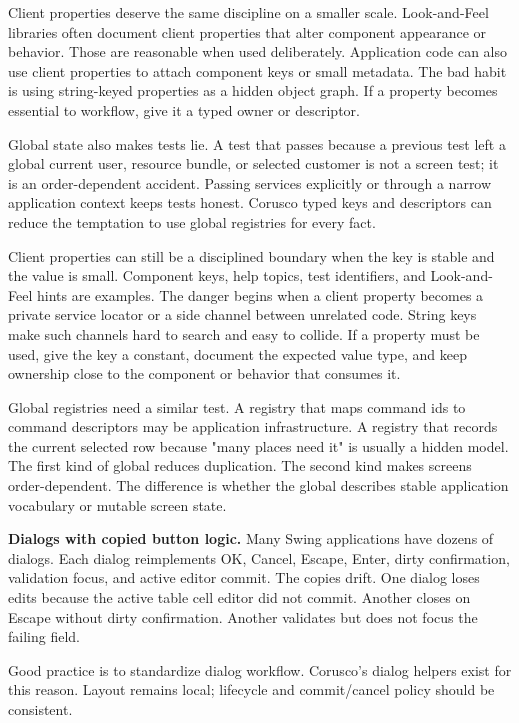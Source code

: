 Client properties deserve the same discipline on a smaller scale. Look-and-Feel
libraries often document client properties that alter component appearance or
behavior. Those are reasonable when used deliberately. Application code can also
use client properties to attach component keys or small metadata. The bad habit
is using string-keyed properties as a hidden object graph. If a property becomes
essential to workflow, give it a typed owner or descriptor.

Global state also makes tests lie. A test that passes because a previous test
left a global current user, resource bundle, or selected customer is not a
screen test; it is an order-dependent accident. Passing services explicitly or
through a narrow application context keeps tests honest. Corusco typed keys and
descriptors can reduce the temptation to use global registries for every fact.

Client properties can still be a disciplined boundary when the key is stable
and the value is small. Component keys, help topics, test identifiers, and
Look-and-Feel hints are examples. The danger begins when a client property
becomes a private service locator or a side channel between unrelated code.
String keys make such channels hard to search and easy to collide. If a
property must be used, give the key a constant, document the expected value
type, and keep ownership close to the component or behavior that consumes it.

Global registries need a similar test. A registry that maps command ids to
command descriptors may be application infrastructure. A registry that records
the current selected row because "many places need it" is usually a hidden
model. The first kind of global reduces duplication. The second kind makes
screens order-dependent. The difference is whether the global describes stable
application vocabulary or mutable screen state.

\textbf{Dialogs with copied button logic.}
Many Swing applications have dozens of dialogs. Each dialog reimplements OK, Cancel, Escape, Enter, dirty confirmation, validation focus, and active editor commit. The copies drift. One dialog loses edits because the active table cell editor did not commit. Another closes on Escape without dirty confirmation. Another validates but does not focus the failing field.

Good practice is to standardize dialog workflow. Corusco's dialog helpers exist for this reason. Layout remains local; lifecycle and commit/cancel policy should be consistent.

